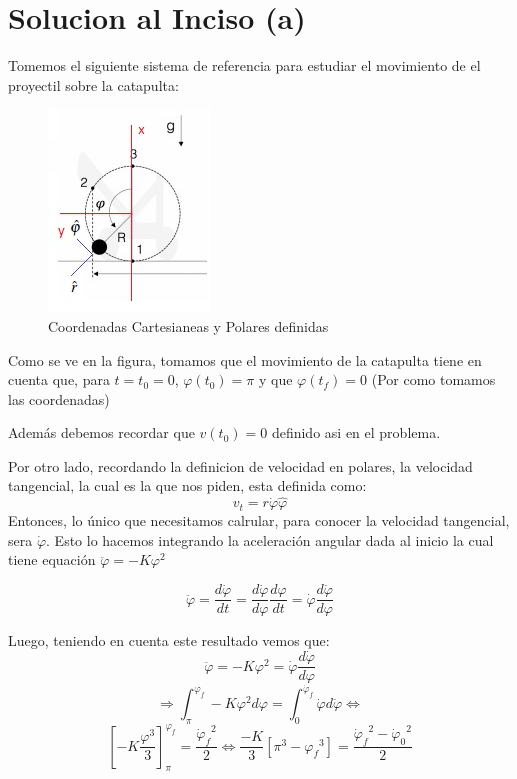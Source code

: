 \documentclass[fleqn,10pt]{SelfArx} %
\newcommand{\sii}{\Longleftrightarrow}
\begin{document}
\section{Solucion al Inciso (a)}
Tomemos el siguiente sistema de referencia para estudiar el movimiento de el proyectil sobre la catapulta:


\begin{figure}[h] %
\centering
\includegraphics[scale=0.8]{figuras/fig2.jpg}
\caption{Coordenadas Cartesianeas y Polares definidas}
\label{fig:2}
\end{figure}

Como se ve en la figura, tomamos que el movimiento de la catapulta tiene en cuenta que, para $t=t_0=0$, ${\varphi}(t_0) = \pi$ y que ${\varphi}(t_f) =0$ (Por como tomamos las coordenadas)

Además debemos recordar que $v(t_0)=0$ definido asi en el problema. 

Por otro lado, recordando la definicion de velocidad en polares, la velocidad tangencial, la cual es la que nos piden, esta definida como:
\begin{equation}
v_t = r \dot{\varphi} \hat{\varphi}
\end{equation}
 Entonces, lo único que necesitamos calrular, para conocer la velocidad tangencial, sera  $\dot{\varphi}$. Esto lo hacemos integrando la aceleración angular dada al inicio la cual tiene equación $\ddot{\varphi} = - K {\varphi}^2$

\[\ddot{\varphi} = \frac{d \dot{\varphi}}{dt} = \frac{d \dot{\varphi}}{d{\varphi}} \frac{d{\varphi}}{dt}= \dot{\varphi} \frac{d \dot{\varphi}}{d{\varphi}}\]

Luego, teniendo en cuenta este resultado vemos que:
\[\ddot{\varphi} = - K {\varphi}^2 = \dot{\varphi} \frac{d{\dot{\varphi}}}{d{\varphi}}\]
\[\Rightarrow \int_{\pi}^{{\varphi}_f} - K {\varphi}^2 d{\varphi} = \int_{0}^{\dot{\varphi}_f} \dot{\varphi} d \dot{\varphi} \sii \]
\[\left[ -K \frac{{\varphi}^3}{3}\right]_{\pi}^{{\varphi}_f} = \frac{{\dot{\varphi}_f}^2}{2} \sii  \frac{-K}{3} \left[{\pi}^3-{{\varphi}_f}^3\right] = \frac{{\dot{\varphi}_f}^2 - {\dot{\varphi}_0}^2}{2}\]
\end{document}
